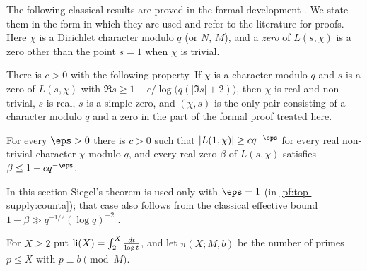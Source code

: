 The following classical results are proved in the formal development \cite{LeanSource2026}. We state them in the
form in which they are used and refer to the literature for proofs. Here $\chi$ is a Dirichlet character modulo
$q$ (or $N$, $M$), and a \emph{zero} of $L(s,\chi)$ is a zero other than the point $s=1$ when $\chi$ is trivial.

\begin{littheorem}
\label{pf:top-supply:zfr}
There is $c>0$ with the following property. If $\chi$ is a character modulo $q$ and $s$ is a zero of $L(s,\chi)$
with $\Re s\ge1-c/\log\big(q(|\Im s|+2)\big)$, then $\chi$ is real and non-trivial, $s$ is real, $s$ is a simple
zero, and $(\chi,s)$ is the only pair consisting of a character modulo $q$ and a zero in the part of the formal proof treated here.
\end{littheorem}

\begin{littheorem}\label{pf:top-supply:siegel}
For every $\eps>0$ there is $c>0$ such that $|L(1,\chi)|\ge cq^{-\eps}$ for every real non-trivial character
$\chi$ modulo $q$, and every real zero $\beta$ of $L(s,\chi)$ satisfies $\beta\le1-cq^{-\eps}$.
 
\end{littheorem}

In this section Siegel's theorem is used only with $\eps=1$ (in \cref{pf:top-supply:counta}); that case also follows
from the classical effective bound $1-\beta\gg q^{-1/2}(\log q)^{-2}$ \cite[Ch.~14]{Davenport2000}.

For $X\ge2$ put $\operatorname{li}(X)=\int_2^X\frac{dt}{\log t}$, and let $\pi(X;M,b)$ be the number of primes $p\le X$
with $p\equiv b\pmod M$.


